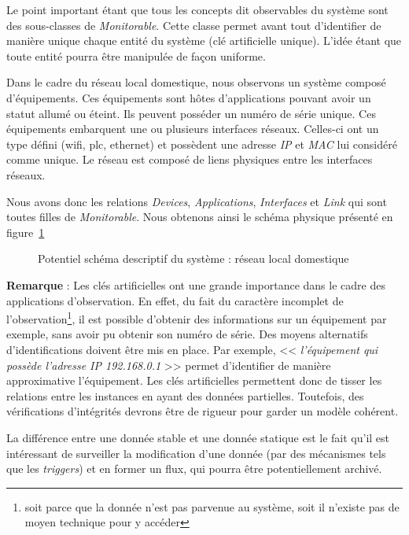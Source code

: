 Le point important étant que tous les concepts dit observables du système sont des sous-classes de \textit{Monitorable}. Cette classe permet avant tout d'identifier de manière unique chaque entité du système (clé artificielle unique). L'idée étant que toute entité pourra être manipulée de façon uniforme.

\begin{example}
	Dans le cadre du réseau local domestique, nous observons un système composé d'équipements. Ces équipements sont hôtes d'applications pouvant avoir un statut allumé ou éteint. Ils peuvent posséder un numéro de série unique. Ces équipements embarquent une ou plusieurs interfaces réseaux. Celles-ci ont un type défini (wifi, plc, ethernet) et possèdent une adresse \textit{IP} et \textit{MAC} lui considéré comme unique. Le réseau est composé de liens physiques entre les interfaces réseaux.
	
	Nous avons donc les relations \textit{Devices}, \textit{Applications}, \textit{Interfaces} et \textit{Link} qui sont toutes filles de \textit{Monitorable}. Nous obtenons ainsi le schéma physique présenté en figure~\ref{fig:contrib:asteroid:theorie:model}
	\begin{figure}[ht]
		\caption{Potentiel schéma descriptif du système : réseau local domestique}\label{fig:contrib:asteroid:theorie:model}
	\end{figure}
\end{example}

\noindent \textbf{Remarque} : Les clés artificielles ont une grande importance dans le cadre des applications d'observation. En effet, du fait du caractère incomplet de l'observation\footnote{soit parce que la donnée n'est pas parvenue au système, soit il n'existe pas de moyen technique pour y accéder}, il est possible d'obtenir des informations sur un équipement par exemple, sans avoir pu obtenir son numéro de série. Des moyens alternatifs d'identifications doivent être mis en place. Par exemple, << \textit{l'équipement qui possède l'adresse IP 192.168.0.1} >> permet d'identifier de manière approximative l'équipement. Les clés artificielles permettent donc de tisser les relations entre les instances en ayant des données partielles. Toutefois, des vérifications d'intégrités devrons être de rigueur pour garder un modèle cohérent.

La différence entre une donnée stable et une donnée statique est le fait qu'il est intéressant de surveiller la modification d'une donnée (par des mécanismes tels que les \textit{triggers}) et en former un flux, qui pourra être potentiellement archivé.

